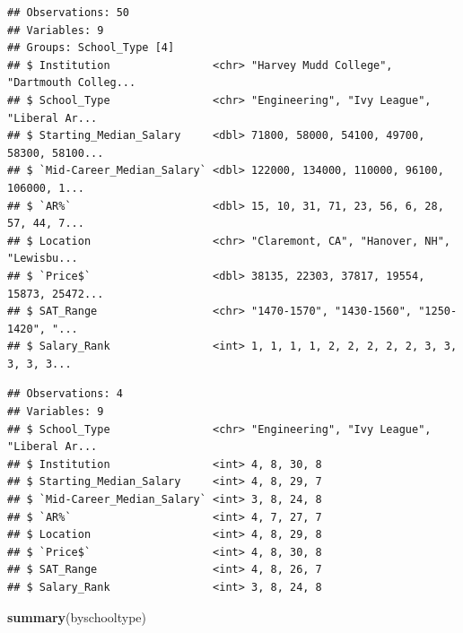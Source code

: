 \documentclass[]{article}
\newenvironment{Shaded}{\begin{snugshade}}{\end{snugshade}}
\newcommand{\KeywordTok}[1]{\textcolor[rgb]{0.13,0.29,0.53}{\textbf{#1}}}
\newcommand{\StringTok}[1]{\textcolor[rgb]{0.31,0.60,0.02}{#1}}
\newcommand{\OperatorTok}[1]{\textcolor[rgb]{0.81,0.36,0.00}{\textbf{#1}}}
\newcommand{\NormalTok}[1]{#1}
\begin{document}
\begin{Shaded}
\end{Shaded}

\begin{verbatim}
## Observations: 50
## Variables: 9
## Groups: School_Type [4]
## $ Institution                <chr> "Harvey Mudd College", "Dartmouth Colleg...
## $ School_Type                <chr> "Engineering", "Ivy League", "Liberal Ar...
## $ Starting_Median_Salary     <dbl> 71800, 58000, 54100, 49700, 58300, 58100...
## $ `Mid-Career_Median_Salary` <dbl> 122000, 134000, 110000, 96100, 106000, 1...
## $ `AR%`                      <dbl> 15, 10, 31, 71, 23, 56, 6, 28, 57, 44, 7...
## $ Location                   <chr> "Claremont, CA", "Hanover, NH", "Lewisbu...
## $ `Price$`                   <dbl> 38135, 22303, 37817, 19554, 15873, 25472...
## $ SAT_Range                  <chr> "1470-1570", "1430-1560", "1250-1420", "...
## $ Salary_Rank                <int> 1, 1, 1, 1, 2, 2, 2, 2, 2, 3, 3, 3, 3, 3...
\end{verbatim}

\begin{Shaded}
\end{Shaded}

\begin{verbatim}
## Observations: 4
## Variables: 9
## $ School_Type                <chr> "Engineering", "Ivy League", "Liberal Ar...
## $ Institution                <int> 4, 8, 30, 8
## $ Starting_Median_Salary     <int> 4, 8, 29, 7
## $ `Mid-Career_Median_Salary` <int> 3, 8, 24, 8
## $ `AR%`                      <int> 4, 7, 27, 7
## $ Location                   <int> 4, 8, 29, 8
## $ `Price$`                   <int> 4, 8, 30, 8
## $ SAT_Range                  <int> 4, 8, 26, 7
## $ Salary_Rank                <int> 3, 8, 24, 8
\end{verbatim}

\begin{Shaded}
\begin{Highlighting}[]
\KeywordTok{summary}\NormalTok{(byschooltype)}
\end{Highlighting}
\end{Shaded}
\end{document}

